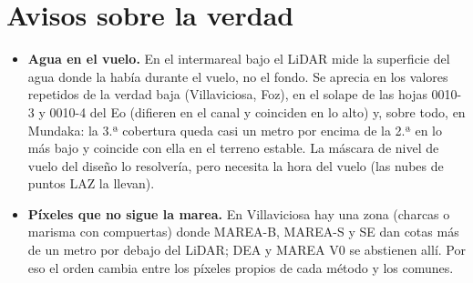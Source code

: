 \documentclass[10pt,a4paper]{article}
\begin{document}


\section*{Avisos sobre la verdad}
\begin{itemize}[leftmargin=1.2em,itemsep=2pt]
\item \textbf{Agua en el vuelo.} En el intermareal bajo el LiDAR mide la superficie del agua donde la había durante el
vuelo, no el fondo. Se aprecia en los valores repetidos de la verdad baja (Villaviciosa, Foz), en el solape de las
hojas 0010-3 y 0010-4 del Eo (difieren en el canal y coinciden en lo alto) y, sobre todo, en Mundaka: la 3.ª cobertura
queda casi un metro por encima de la 2.ª en lo más bajo y coincide con ella en el terreno estable. La máscara de nivel
de vuelo del diseño lo resolvería, pero necesita la hora del vuelo (las nubes de puntos LAZ la llevan).
\item \textbf{Píxeles que no sigue la marea.} En Villaviciosa hay una zona (charcas o marisma con compuertas) donde
MAREA-B, MAREA-S y SE dan cotas más de un metro por debajo del LiDAR; DEA y MAREA V0 se abstienen allí. Por eso el
orden cambia entre los píxeles propios de cada método y los comunes.
\end{itemize}
\end{document}
